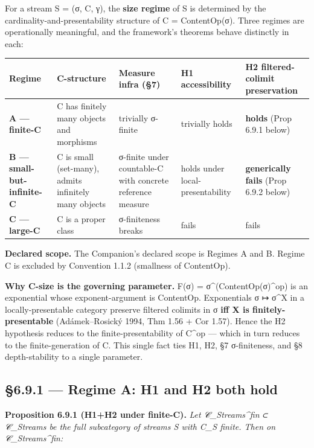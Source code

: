 \documentclass[11pt, openany]{book}
\begin{document}
For a stream S = (σ, C, γ), the \textbf{size regime} of S is determined by the cardinality-and-presentability structure of C = ContentOp(σ). Three regimes are operationally meaningful, and the framework's theorems behave distinctly in each:

\begingroup\setlength{\tabcolsep}{3pt}\renewcommand{\arraystretch}{1.15}\footnotesize
\begin{longtable}{p{0.59in} p{1.05in} p{1.15in} p{0.63in} p{0.79in}}
\toprule
Regime & C-structure & Measure infra (§7) & H1 accessibility & H2 filtered-colimit preservation \\
\midrule
\endhead
\bottomrule
\endfoot
\textbf{A --- finite-C} & C has finitely many objects and morphisms & trivially σ-finite & trivially holds & \textbf{holds} (Prop 6.9.1 below) \\
\midrule
\textbf{B --- small-but-infinite-C} & C is small (set-many), admits infinitely many objects & σ-finite under countable-C with concrete reference measure & holds under local-presentability & \textbf{generically fails} (Prop 6.9.2 below) \\
\midrule
\textbf{C --- large-C} & C is a proper class & σ-finiteness breaks & fails & fails \\
\bottomrule
\end{longtable}
\endgroup
\textbf{Declared scope.} The Companion's declared scope is Regimes A and B. Regime C is excluded by Convention 1.1.2 (smallness of ContentOp).

\textbf{Why C-size is the governing parameter.} F(σ) = σ\textasciicircum{}(ContentOp(σ)\textasciicircum{}op) is an exponential whose exponent-argument is ContentOp. Exponentials σ ↦ σ\textasciicircum{}X in a locally-presentable category preserve filtered colimits in σ \textbf{iff X is finitely-presentable} (Adámek–Rosický 1994, Thm 1.56 + Cor 1.57). Hence the H2 hypothesis reduces to the finite-presentability of C\textasciicircum{}op --- which in turn reduces to the finite-generation of C. This single fact ties H1, H2, §7 σ-finiteness, and §8 depth-stability to a single parameter.

\subsection{§6.9.1 --- Regime A: H1 and H2 both hold}

\textbf{Proposition 6.9.1 (H1+H2 under finite-C).} \textit{Let 𝒞\_\allowbreak{}Streams\textasciicircum{}{fin} ⊂ 𝒞\_\allowbreak{}Streams be the full subcategory of streams S with C\_\allowbreak{}S finite. Then on 𝒞\_\allowbreak{}Streams\textasciicircum{}{fin}:}
\end{document}
